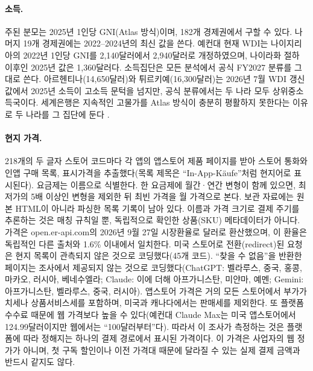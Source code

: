\documentclass[11pt]{article}
\theoremstyle{definition}
\theoremstyle{remark}
\begin{document}
\paragraph{소득.} 주된 분모는 2025년 1인당 GNI(Atlas 방식)이며, 182개 경제권에서 구할 수 있다. 나머지 19개 경제권에는 2022--2024년의 최신 값을 쓴다. 예컨대 현재 WDI는 나이지리아의 2022년 1인당 GNI를 2,140달러에서 2,940달러로 개정하였으며, 나이라화 절하 이후인 2025년 값은 1,360달러다. 소득집단은 모든 분석에서 공식 FY2027 분류를 그대로 쓴다. 아르헨티나(14,650달러)와 튀르키예(16,300달러)는 2026년 7월 WDI 갱신값에서 2025년 소득이 고소득 문턱을 넘지만, 공식 분류에서는 두 나라 모두 상위중소득국이다. 세계은행은 지속적인 고물가를 Atlas 방식이 충분히 평활하지 못한다는 이유로 두 나라를 그 집단에 둔다 \citep{worldbank2026class}.

\paragraph{현지 가격.} 218개의 두 글자 스토어 코드마다 각 앱의 앱스토어 제품 페이지를 받아 스토어 통화와 인앱 구매 목록, 표시가격을 추출했다(목록 제목은 ``In-App-Käufe''처럼 현지어로 표시된다). 요금제는 이름으로 식별한다. 한 요금제에 월간·연간 변형이 함께 있으면, 최저가의 5배 이상인 변형을 제외한 뒤 최빈 가격을 월 가격으로 본다. 보관 자료에는 원본 HTML이 아니라 파싱한 목록 기록이 남아 있다. 이름과 가격 크기로 결제 주기를 추론하는 것은 매칭 규칙일 뿐, 독립적으로 확인한 상품(SKU) 메타데이터가 아니다. 가격은 open.er-api.com의 2026년 9월 27일 시장환율로 달러로 환산했으며, 이 환율은 독립적인 다른 출처와 1.6\% 이내에서 일치한다. 미국 스토어로 전환(redirect)된 요청은 현지 목록이 관측되지 않은 것으로 코딩했다(45개 코드). ``찾을 수 없음''을 반환한 페이지는 조사에서 제공되지 않는 것으로 코딩했다(ChatGPT: 벨라루스, 중국, 홍콩, 마카오, 러시아, 베네수엘라; Claude: 이에 더해 아프가니스탄, 미얀마, 예멘; Gemini: 아프가니스탄, 벨라루스, 중국, 러시아). 앱스토어 가격은 거의 모든 스토어에서 부가가치세나 상품서비스세를 포함하며, 미국과 캐나다에서는 판매세를 제외한다. 또 플랫폼 수수료 때문에 웹 가격보다 높을 수 있다(예컨대 Claude Max는 미국 앱스토어에서 124.99달러이지만 웹에서는 ``100달러부터''다). 따라서 이 조사가 측정하는 것은 플랫폼에 따라 정해지는 하나의 결제 경로에서 표시된 가격이다. 이 가격은 사업자의 웹 정가가 아니며, 첫 구독 할인이나 이전 가격대 때문에 달라질 수 있는 실제 결제 금액과 반드시 같지도 않다.
\end{document}
